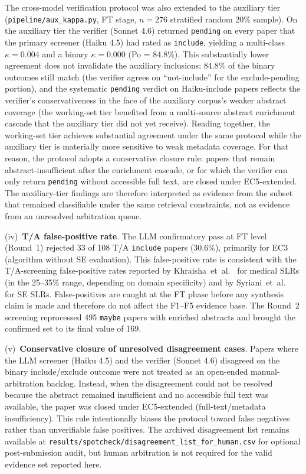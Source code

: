 The cross-model verification protocol was also extended to the auxiliary
tier (\texttt{pipeline/aux\_kappa.py}, FT stage, $n = 276$ stratified
random 20\% sample). On the auxiliary tier the verifier (Sonnet 4.6)
returned \texttt{pending} on every paper that the primary screener
(Haiku 4.5) had rated as \texttt{include}, yielding a multi-class
$\kappa = 0.004$ and a binary $\kappa = 0.000$ (Po = 84.8\%). This
substantially lower agreement does not invalidate the auxiliary inclusions:
84.8\% of the binary outcomes still match (the verifier agrees on
``not-include'' for the exclude-pending portion), and the systematic
\texttt{pending} verdict on Haiku-include papers reflects the verifier's
conservativeness in the face of the auxiliary corpus's weaker abstract
coverage (the working-set tier benefited from a multi-source abstract
enrichment cascade that the auxiliary tier did not yet receive). Reading
together, the working-set tier achieves substantial agreement under the
same protocol while the auxiliary tier is materially more sensitive to weak
metadata coverage. For that reason, the protocol adopts a conservative
closure rule: papers that remain abstract-insufficient after the enrichment
cascade, or for which the verifier can only return \texttt{pending} without
accessible full text, are closed under EC5-extended. The auxiliary-tier
findings are therefore interpreted as evidence from the subset that remained
classifiable under the same retrieval constraints, not as evidence from an
unresolved arbitration queue.



(iv)~\textbf{T/A false-positive rate}.
The LLM confirmatory pass at FT level (Round~1) rejected 33 of 108 T/A
\texttt{include} papers (30.6\%), primarily for EC3 (algorithm without SE
evaluation). This false-positive rate is consistent with the
T/A-screening false-positive rates reported by Khraisha~et~al.\
\cite{khraisha2024} for medical SLRs (in the 25--35\% range, depending on
domain specificity) and by Syriani~et~al.~\cite{syriani2023} for SE
SLRs. False-positives are caught at the FT phase before any synthesis claim
is made and therefore do not affect the F1--F5 evidence base. The Round~2
screening reprocessed 495 \texttt{maybe} papers with enriched abstracts and
brought the confirmed set to its final value of 169.

(v)~\textbf{Conservative closure of unresolved disagreement cases}.
Papers where the LLM screener (Haiku 4.5) and the verifier (Sonnet 4.6)
disagreed on the binary include/exclude outcome were not treated as an
open-ended manual-arbitration backlog. Instead, when the disagreement could
not be resolved because the abstract remained insufficient and no accessible
full text was available, the paper was closed under EC5-extended
(full-text/metadata insufficiency). This rule intentionally biases the
protocol toward false negatives rather than unverifiable false positives.
The archived disagreement list remains available at
\texttt{results/spotcheck/disagreement\_list\_for\_human.csv} for optional
post-submission audit, but human arbitration is not required for the valid
evidence set reported here.

